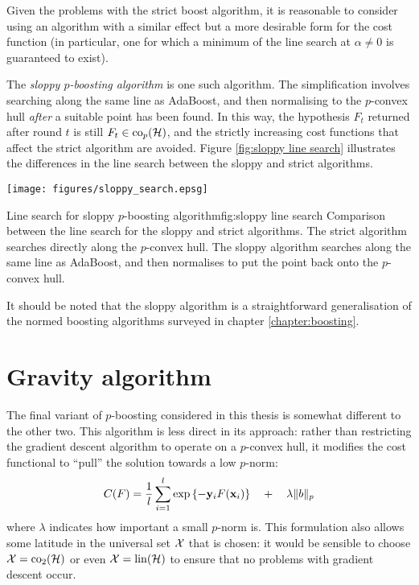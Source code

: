 Given the problems with the strict boost algorithm, it is reasonable
to consider using an algorithm with a similar effect but a more
desirable form for the cost function (in particular, one for which a
minimum of the line search at $\alpha \neq 0$ is guaranteed to
exist).

The \emph{sloppy $p$-boosting algorithm} is one such algorithm.  The
simplification involves searching along the same line as AdaBoost, and
then normalising to the $p$-convex hull \emph{after} a suitable point
has been found.  In this way, the hypothesis $F_t$ returned after
round $t$ is still $F_t \in \mathrm{co}_p(\mathcal{H})$, and the strictly increasing
cost functions that affect the strict algorithm are avoided.  Figure
\ref{fig:sloppy line search} illustrates the differences in the line
search between the sloppy and strict algorithms.

\begin{linefigure}
\begin{center}
\texttt{[image: figures/sloppy\_search.epsg]}
\end{center}
\begin{capt}{Line search for sloppy $p$-boosting algorithm}{fig:sloppy line search}
Comparison between the line search for the sloppy and strict
algorithms.  The strict algorithm searches directly along the
$p$-convex hull.  The sloppy algorithm searches along the same line as
AdaBoost, and then normalises to put the point back onto the
$p$-convex hull.
\end{capt}
\end{linefigure}

It should be noted that the sloppy algorithm is a straightforward
generalisation of the normed boosting algorithms surveyed in chapter
\ref{chapter:boosting}.


\section{Gravity algorithm}

The final variant of $p$-boosting considered in this thesis is
somewhat different to the other two.  This algorithm is less direct in
its approach: rather than restricting the gradient descent algorithm
to operate on a $p$-convex hull, it modifies the cost functional to
``pull'' the solution towards a low $p$-norm:
%
\begin{equation}
C(F) = \frac{1}{l} \sum_{i=1}^{l} \exp
\left\{ -\mathbf{y}_iF(\mathbf{x}_i) \right\} \quad + \quad \lambda \|b\|_p
\label{eqn:regularisation}
\end{equation}
%
where $\lambda$ indicates how important a small $p$-norm is.  This
formulation also allows some latitude in the universal set $\mathcal{X}$
that is chosen: it would be sensible to choose $\mathcal{X} = \mathrm{co}_2(\mathcal{H})$
or even $\mathcal{X} = \mathrm{lin}(\mathcal{H})$ to ensure that no problems with gradient
descent occur.

